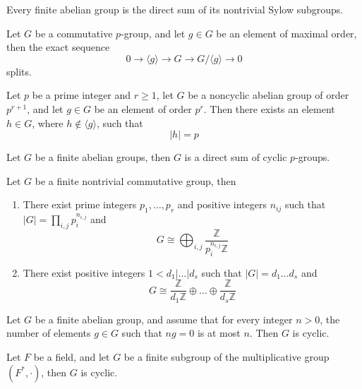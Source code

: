 \documentclass[openany]{book}
\newcommand{\Z}{\mathbb{Z}}
\newcommand{\la}{\langle}
\newcommand{\ra}{\rangle}
\begin{document}
\begin{cor}
    Every finite abelian group is the direct sum of its nontrivial Sylow subgroups.
\end{cor}
\begin{lem}
    Let $G$ be a commutative $p$-group, and let $g\in G$ be an element of maximal order, then the exact sequence 
    \begin{equation*}
        0\to \la g\ra\to G\to G/\la g\ra\to 0
    \end{equation*}
    splits.
\end{lem}
\begin{lem}
    Let $p$ be a prime integer and $r\geq 1$, let $G$ be a noncyclic abelian group of order $p^{r+1}$, and let $g\in G$ be an element of order $p^r$. Then there exists an element $h\in G$, where $h\not\in\la g\ra$, such that 
    \begin{equation*}
        |h|=p
    \end{equation*}
\end{lem}
\begin{cor}
    Let $G$ be a finite abelian groups, then $G$ is a direct sum of cyclic $p$-groups.
\end{cor}
\begin{thm}
    Let $G$ be a finite nontrivial commutative group, then 
    \begin{enumerate}
        \item There exist prime integers $p_1,\dots, p_r$ and positive integers $n_{ij}$ such that $|G|=\prod_{i,j}p_i^{n_{i,j}}$ and 
        \begin{equation*}
            G\cong\bigoplus_{i,j}\frac{\mathbb{Z}}{p_i^{n_{i,j}}\mathbb{Z}}
        \end{equation*}
        \item There exist positive integers $1<d_1\vert\dots\vert d_s$ such that $|G|=d_1\dots d_s$ and 
        \begin{equation*}
            G\cong \frac{\Z}{d_1\Z}\oplus\dots\oplus\frac{\Z}{d_s\Z}
        \end{equation*}
    \end{enumerate}
\end{thm}
\begin{lem}
    Let $G$ be a finite abelian group, and assume that for every integer $n>0$, the number of elements $g\in G$ such that $ng=0$ is at most $n$. Then $G$ is cyclic.
\end{lem}

\begin{thm}
    Let $F$ be a field, and let $G$ be a finite subgroup of the multiplicative group $(F^*,\cdot)$, then $G$ is cyclic.
\end{thm}
\end{document}
